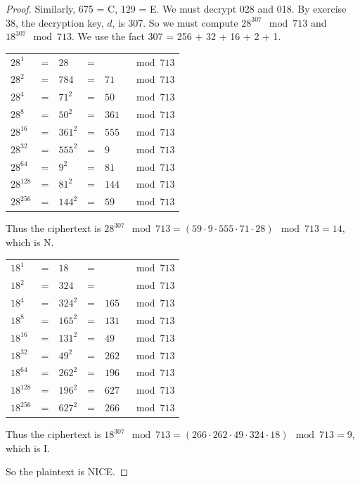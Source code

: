 \documentclass[14pt]{extarticle}
\begin{document}
\begin{proof}
Similarly, 675 = C, 129 = E. We must decrypt 028 and 018. By exercise 38, the decryption key, $d$, is 307. So we must
compute \(28^{307} \mod 713\) and \(18^{307} \mod 713\). We use the fact 307 = 256 + 32 + 16 + 2 + 1.

\begin{tabular}{lclcll}
\(28^1\)&=&\(28\)&=&\(\)&\(\mod 713\) \\
\(28^2\)&=&\(784\)&=&\(71\)&\(\mod 713\) \\
\(28^4\)&=&\(71^2\)&=&\(50\)&\(\mod 713\) \\
\(28^8\)&=&\(50^2\)&=&\(361\)&\(\mod 713\) \\
\(28^{16}\)&=&\(361^2\)&=&\(555\)&\(\mod 713\) \\
\(28^{32}\)&=&\(555^2\)&=&\(9\)&\(\mod 713\) \\
\(28^{64}\)&=&\(9^2\)&=&\(81\)&\(\mod 713\) \\
\(28^{128}\)&=&\(81^2\)&=&\(144\)&\(\mod 713\) \\
\(28^{256}\)&=&\(144^2\)&=&\(59\)&\(\mod 713\) \\
\end{tabular}

Thus the ciphertext is \(28^{307} \mod 713 = (59 \cdot 9 \cdot 555 \cdot 71 \cdot 28) \mod 713 = 14\), which is N.

\begin{tabular}{lclcll}
\(18^1\)&=&\(18\)&=&\(\)&\(\mod 713\) \\
\(18^2\)&=&\(324\)&=&\(\)&\(\mod 713\) \\
\(18^4\)&=&\(324^2\)&=&\(165\)&\(\mod 713\) \\
\(18^8\)&=&\(165^2\)&=&\(131\)&\(\mod 713\) \\
\(18^{16}\)&=&\(131^2\)&=&\(49\)&\(\mod 713\) \\
\(18^{32}\)&=&\(49^2\)&=&\(262\)&\(\mod 713\) \\
\(18^{64}\)&=&\(262^2\)&=&\(196\)&\(\mod 713\) \\
\(18^{128}\)&=&\(196^2\)&=&\(627\)&\(\mod 713\) \\
\(18^{256}\)&=&\(627^2\)&=&\(266\)&\(\mod 713\) \\
\end{tabular}

Thus the ciphertext is \(18^{307} \mod 713 = (266 \cdot 262 \cdot 49 \cdot 324 \cdot 18) \mod 713 = 9\), which is I.

So the plaintext is NICE.
\end{proof}
\end{document}
